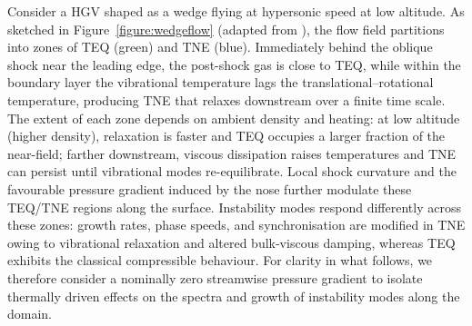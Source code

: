 Consider a \gls{HGV} shaped as a wedge flying at hypersonic speed at low altitude. As sketched in Figure~\ref{figure:wedgeflow} (adapted from \citet{williams2021}), the flow field partitions into zones of \gls{TEQ} (green) and \gls{TNE} (blue). Immediately behind the oblique shock near the leading edge, the post-shock gas is close to \gls{TEQ}, while within the boundary layer the vibrational temperature lags the translational–rotational temperature, producing \gls{TNE} that relaxes downstream over a finite time scale. The extent of each zone depends on ambient density and heating: at low altitude (higher density), relaxation is faster and \gls{TEQ} occupies a larger fraction of the near-field; farther downstream, viscous dissipation raises temperatures and \gls{TNE} can persist until vibrational modes re-equilibrate. Local shock curvature and the favourable pressure gradient induced by the nose further modulate these \gls{TEQ}/\gls{TNE} regions along the surface. Instability modes respond differently across these zones: growth rates, phase speeds, and synchronisation are modified in \gls{TNE} owing to vibrational relaxation and altered bulk-viscous damping, whereas \gls{TEQ} exhibits the classical compressible behaviour. For clarity in what follows, we therefore consider a nominally zero streamwise pressure gradient to isolate thermally driven effects on the spectra and growth of instability modes along the domain.




